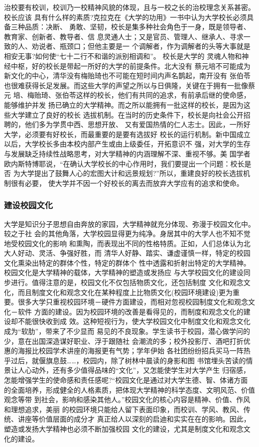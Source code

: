 \documentclass[11pt]{ctexart}
\begin{document}
{{{{治校要有校训，校训乃一校精神风貌的体现，且与一校之长的治校理念关系甚密。校长应该
具有什么样的素质?克拉克在《大学的功用》一书中认为大学校长必须具备三种品质：决断、
勇敢、坚韧，校长是集多种社会角色于一身，既是领导者、 教育家、创新者、教导者、信
息灵通人士；又是官员、管理人、继承人、寻求一致的人、劝说者、瓶颈口；但他主要是一
个调解者，作为调解者的头等大事就是相安无事?如何使“七十二行不和谐的派别相调和”。
校长是大学的 灵魂人物和神经中枢，好的校长是带起一所好的大学的前提条件。北大没有
蔡元培不可能成为新文化的中心，清华没有梅贻琦也不可能在短时间内声名鹊起，南开没有
张伯苓也很难获得长足发展。而这些大学的声望之所以与日俱隆，关键在于拥有一批像蔡元
培、梅贻琦、张伯苓这样的校长，他们有共同的追求，有前承后继的使命感，能够维护并发
扬已确立的大学精神。而之所以能拥有一批这样的校长，是因为这些大学建立了良好的校长
选拔机制。在当时的历史条件下，校长是向社会公开招聘的，他们多为学贯中西、思想开放、
又有爱国热情的仁人志士。因此，一所好大学，必须要有好校长，而最重要的是要有选拔好
校长的运行机制。新中国成立以后，大学校长多由本校内部产生或由上级委任，开拓意识不
强，对大学的生存与发展缺乏持续性战略思考，对大学精神的内涵理解不深、重视不够。美
国学者欧内斯特博耶说，“在确认大学校长的中心作用时，我们要提出一个问题：校长是否
为大学提出了鼓舞人心的宏图大计和远景规划?”所以，重建良好的校长选拔机制很有必要，
使大学并不因一个好校长的离去而放弃大学应有的追求和使命。


\subsubsection{建设校园文化}
\label{sec:org436e522}

大学是知识分子思想自由奔放的家园，大学精神就充分体现、弥漫于校园文化中。较之于社
会的其他角落，大学校园显得更为纯净。身居其中的大学人也不知不觉地受校园文化的影响
和熏陶，而表现出不同的性格特质。正如，人们总体认为北大人好动、灵活、争强好胜，而
清华人好静、踏实、谦虚谨慎一样，特定的校园文化熏染出特定的群体个性，特定的群体个
性中透露和折射出特定的大学精神。校园文化是大学精神的载体，大学精神的塑造或发扬应
与大学校园文化的建设同步进行。值得注意的是，校园文化不仅包括物质文化，还包括制度
文化和观念文化，而且制度文化和观念文化在某种程度上比物质文化(校园环境建设)更为重
要。很多大学只重视校园环境－硬件方面建设，而相对忽视校园制度文化和观念文化－软件
方面的建设。因为校园环境的改善是看得见的，而制度和观念文化的建设却不能很快收到成
效。这种短视行为，使大学校园文化中制度文化和观念文化成为“软肋”，带来了不少显而
易见的不良现象。学生读书于校园，潜心做学问的少，意在出国深造谋好职业、浮于跟随社
会潮流的多；校外投影厅、酒吧打折优惠的海报比校园学术讲座的海报更有气势；学年伊始
各社团纷纷招兵买马一阵热乎过后，就偃旗息鼓……，校园内，除了树林中晨读的身影和图
书馆埋头苦读的情景让人心动外，还有多少值得品味的“文化”，又怎能使学生对大学产生
归宿感，怎能增强学生的使命感和责任感呢?“校园文化是通过对大学生德、智、体诸方面
的全面培养，形成健全的人格素质，把体现大学精神的科学态度、文明风范、价值观念等带
到社会，影响和感染其他人。”校园文化的核心内容是精神、价值、作风和理想追求，美丽
的校园环境只能给人留下表面印象，而校训、学风、教风、传统、讲座等价值层面的成分才
真正给人以深刻的启迪和实实在在的影响。因此，塑造或发扬大学精神也必须不断加强校园
文化的建设，尤其是制度文化和观念文化的建设。


}}}}
\end{document}
